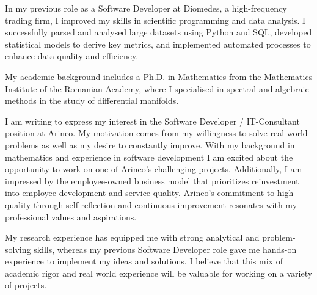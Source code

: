 \documentclass[11pt, a4paper]{awesome-cv}
\begin{document}
\makecvheader[R]

\makecvfooter
  {}
  {}
  {}

\makelettertitle

\begin{cvletter}

In my previous role as a Software Developer at Diomedes, a high-frequency trading firm, I improved my skills in scientific programming and data analysis. I successfully parsed and analysed large datasets using Python and SQL, developed statistical models to derive key metrics, and implemented automated processes to enhance data quality and efficiency. 

My academic background includes a Ph.D. in Mathematics from the Mathematics Institute of the Romanian Academy, where I specialised in spectral and algebraic methods in the study of differential manifolds.

I am writing to express my interest in the Software Developer / IT-Consultant position at Arineo. My motivation comes from my willingness to solve real world problems as well as my desire to constantly improve. With my background in mathematics and experience in software development I am excited about the opportunity to work on one of Arineo’s challenging projects. Additionally, I am impressed by the employee-owned business model that prioritizes reinvestment into employee development and service quality. Arineo's commitment to high quality through self-reflection and continuous improvement resonates with my professional values and aspirations.

My research experience has equipped me with strong analytical and problem-solving skills, whereas my previous Software Developer role gave me hands-on experience to implement my ideas and solutions. I believe that this mix of academic rigor and real world experience will be valuable for working on a variety of projects.

\end{cvletter}


\makeletterclosing
\end{document}
